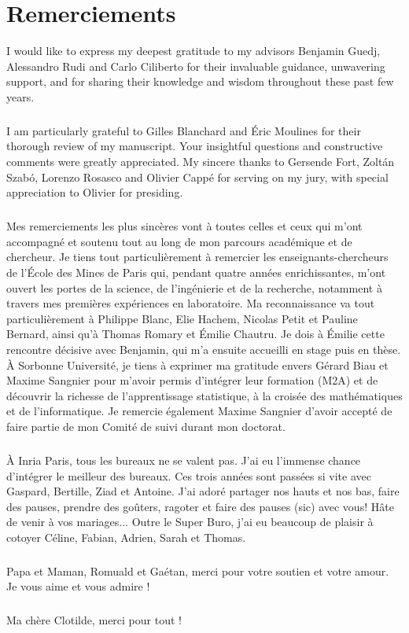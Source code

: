 \chapter{Remerciements}
I would like to express my deepest gratitude to my advisors Benjamin Guedj, Alessandro Rudi and Carlo Ciliberto for their invaluable guidance, unwavering support, and for sharing their knowledge and wisdom throughout these past few years.
\paragraph{}
I am particularly grateful to Gilles Blanchard and Éric Moulines for their thorough review of my manuscript. Your insightful questions and constructive comments were greatly appreciated. My sincere thanks to Gersende Fort, Zoltán Szabó, Lorenzo Rosasco and Olivier Cappé for serving on my jury, with special appreciation to Olivier for presiding.
\paragraph{}
Mes remerciements les plus sincères vont à toutes celles et ceux qui m'ont accompagné et soutenu tout au long de mon parcours académique et de chercheur. Je tiens tout particulièrement à remercier les enseignants-chercheurs de l'École des Mines de Paris qui, pendant quatre années enrichissantes, m'ont ouvert les portes de la science, de l'ingénierie et de la recherche, notamment à travers mes premières expériences en laboratoire. Ma reconnaissance va tout particulièrement à Philippe Blanc, Elie Hachem, Nicolas Petit et Pauline Bernard, ainsi qu'à Thomas Romary et Émilie Chautru. Je dois à Émilie cette rencontre décisive avec Benjamin, qui m'a ensuite accueilli en stage puis en thèse.
À Sorbonne Université, je tiens à exprimer ma gratitude envers Gérard Biau et Maxime Sangnier pour m'avoir permis d'intégrer leur formation (M2A) et de découvrir la richesse de l'apprentissage statistique, à la croisée des mathématiques et de l'informatique. Je remercie également Maxime Sangnier d'avoir accepté de faire partie de mon Comité de suivi durant mon doctorat.
\paragraph{}
À Inria Paris, tous les bureaux ne se valent pas. J'ai eu l'immense chance d'intégrer le meilleur des bureaux. Ces trois années sont passées si vite avec Gaspard, Bertille, Ziad et Antoine. J'ai adoré partager nos hauts et nos bas, faire des pauses, prendre des goûters, ragoter et faire des pauses (sic) avec vous! Hâte de venir à vos mariages...
Outre le Super Buro, j'ai eu beaucoup de plaisir à cotoyer Céline, Fabian, Adrien, Sarah et Thomas.
\paragraph{}
Papa et Maman, Romuald et Gaétan, merci pour votre soutien et votre amour. Je vous aime et vous admire !
\paragraph{}
Ma chère Clotilde, merci pour tout !
